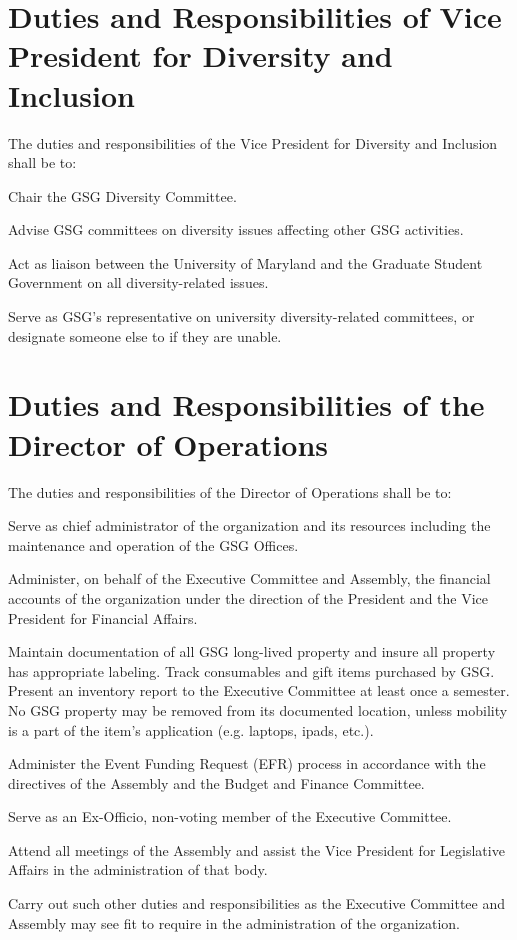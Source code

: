\section{Duties and Responsibilities of Vice President for Diversity and Inclusion}
The duties and responsibilities of the Vice President for Diversity and Inclusion shall be to:
\begin{bylaws-number}
	\item Chair the GSG Diversity Committee.
	\item Advise GSG committees on diversity issues affecting other GSG activities.
	\item Act as liaison between the University of Maryland and the Graduate Student Government on all diversity-related issues.
	\item Serve as GSG’s representative on university diversity-related committees, or designate someone else to if they are unable.
\end{bylaws-number}

\section{Duties and Responsibilities of the Director of Operations}
The duties and responsibilities of the Director of Operations shall be to:
\begin{bylaws-number}
  \item Serve as chief administrator of the organization and its resources including the maintenance and operation of the GSG Offices.
  \item Administer, on behalf of the Executive Committee and Assembly, the financial accounts of the organization under the direction of the President and the Vice President for Financial Affairs.
  \item Maintain documentation of all GSG long-lived property and insure all property has appropriate labeling. Track consumables and gift items purchased by GSG. Present an inventory report to the Executive Committee at least once a semester. No GSG property may be removed from its documented location, unless mobility is a part of the item’s application (e.g. laptops, ipads, etc.).
  \item Administer the Event Funding Request (EFR) process in accordance with the directives of the Assembly and the Budget and Finance Committee.
  \item Serve as an Ex-Officio, non-voting member of the Executive Committee.
  \item Attend all meetings of the Assembly and assist the Vice President for Legislative Affairs in the administration of that body.
  \item Carry out such other duties and responsibilities as the Executive Committee and Assembly may see fit to require in the administration of the organization.
\end{bylaws-number}

